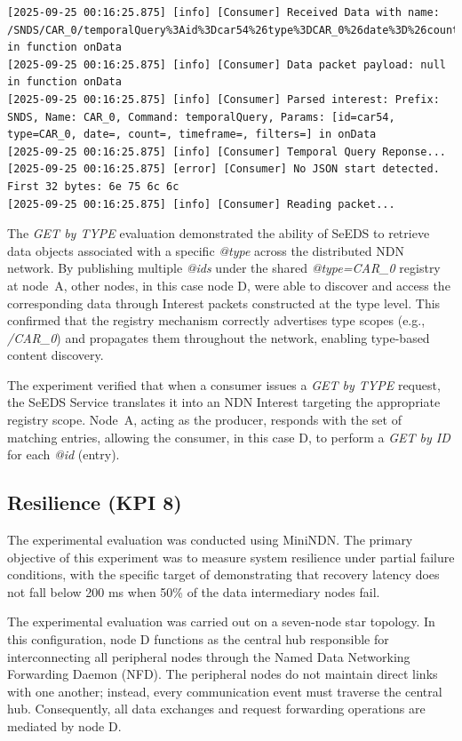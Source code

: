 \documentclass{article}
\begin{document}
\begin{lstlisting}[language=log, caption={D's log after receiving the registry payload, which are the \textit{@ids}, and performing a \emph{GET by ID} for each},label={lst:get-by-id-after-get-by-type-d}]
[2025-09-25 00:16:25.875] [info] [Consumer] Received Data with name: /SNDS/CAR_0/temporalQuery%3Aid%3Dcar54%26type%3DCAR_0%26date%3D%26count%3D%26timeframe%3D%26filters%3D in function onData
[2025-09-25 00:16:25.875] [info] [Consumer] Data packet payload: null in function onData
[2025-09-25 00:16:25.875] [info] [Consumer] Parsed interest: Prefix: SNDS, Name: CAR_0, Command: temporalQuery, Params: [id=car54, type=CAR_0, date=, count=, timeframe=, filters=] in onData
[2025-09-25 00:16:25.875] [info] [Consumer] Temporal Query Reponse...
[2025-09-25 00:16:25.875] [error] [Consumer] No JSON start detected. First 32 bytes: 6e 75 6c 6c 
[2025-09-25 00:16:25.875] [info] [Consumer] Reading packet...
\end{lstlisting}

The \textit{GET by TYPE} evaluation demonstrated the ability of SeEDS to retrieve data objects associated with a specific \textit{@type} across the distributed NDN network. By publishing multiple \textit{@ids} under the shared \textit{@type=CAR\_0} registry at node~A, other nodes, in this case node D, were able to discover and access the corresponding data through Interest packets constructed at the type level. This confirmed that the registry mechanism correctly advertises type scopes (e.g., \textit{/CAR\_0}) and propagates them throughout the network, enabling type-based content discovery.

The experiment verified that when a consumer issues a \textit{GET by TYPE} request, the SeEDS Service translates it into an NDN Interest targeting the appropriate registry scope. Node~A, acting as the producer, responds with the set of matching entries, allowing the consumer, in this case D, to perform a \emph{GET by ID} for each \textit{@id} (entry).

\subsection{Resilience (KPI 8)}

The experimental evaluation was conducted using MiniNDN. The primary objective of this experiment was to measure system resilience under partial failure conditions, with the specific target of demonstrating that recovery latency does not fall below 200 ms when 50\% of the data intermediary nodes fail.

The experimental evaluation was carried out on a seven-node star topology. In this configuration, node D functions as the central hub responsible for interconnecting all peripheral nodes through the Named Data Networking Forwarding Daemon (NFD). The peripheral nodes do not maintain direct links with one another; instead, every communication event must traverse the central hub. Consequently, all data exchanges and request forwarding operations are mediated by node D.
\end{document}

